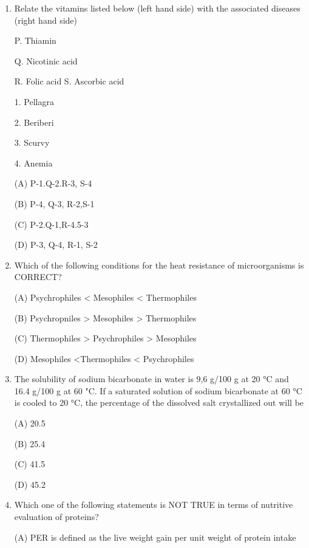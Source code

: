 \documentclass[journal]{IEEEtran}
\begin{document}
\begin{enumerate}
{water both (D) Gram negative, non-motile, non-spore forming and transmitted by fecal-oral route
		}
	\item {Relate the vitamins listed below (left hand side) with the associated diseases (right hand side)}
\begin{minipage}{0.5\textwidth}
	\begin{flushleft}

P. Thiamin

Q. Nicotinic acid

R. Folic acid
S. Ascorbic acid
		\end{flushleft}
		\end{minipage}
	\begin{minipage}{0.5\textwidth}
		\begin{flushright}
1. Pellagra

2. Beriberi

3. Scurvy

4. Anemia
		\end{flushright}
		\end{minipage}


(A) P-1.Q-2.R-3, S-4

(B) P-4, Q-3, R-2,S-1

(C) P-2.Q-1,R-4.5-3

(D) P-3, Q-4, R-1, S-2

\item{ Which of the following conditions for the heat resistance of microorganisms is CORRECT?

(A) Psychrophiles < Mesophiles < Thermophiles

(B) Psychropniles > Mesophiles > Thermophiles

(C) Thermophiles > Psychrophiles > Mesophiles

(D) Mesophiles <Thermophiles < Psychrophiles
}
\item{ The solubility of sodium bicarbonate in water is 9,6 g/100 g at 20 °C and 16.4 g/100 g at 60 "C. If a saturated solution of sodium bicarbonate at 60 °C is cooled to 20 °C, the percentage of the dissolved salt crystallized out will be

(A) 20.5

(B) 25.4

(C) 41.5

(D) 45.2
}

\item {Which one of the following statements is NOT TRUE in terms of nutritive evaluation of proteins?

(A) PER is defined as the live weight gain per unit weight of protein intake

}
\end{enumerate}
\end{document}
